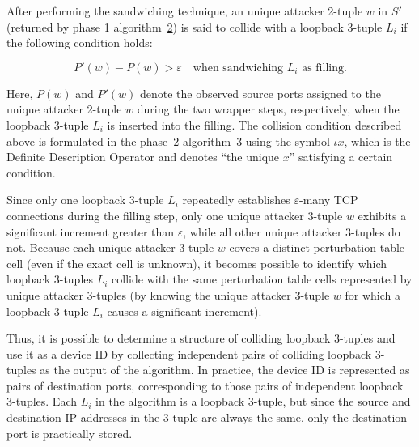 \documentclass[twocolumn]{report}
\begin{document}
After performing the sandwiching technique, an \alert{unique attacker 2-tuple \(w\)} in $S'$ (returned by phase 1 algorithm~\hyperref[alg:phase1]{2}) is said to collide with a \alert{loopback 3-tuple \(L_i\)} if the following \alert{condition} holds:

\begin{minipage}{\columnwidth}
	\begin{equation*}
		P'(w) - P(w) > \varepsilon
		\quad \text{when sandwiching } L_i \text{ as filling.}
	\end{equation*}
\end{minipage}

Here, \(P(w)\) and \(P'(w)\) denote the observed \alert{source ports assigned to} the \alert{unique attacker 2-tuple \(w\)} during the two wrapper steps, respectively, when the loopback 3-tuple \(L_i\) is inserted into the filling. The collision condition described above is formulated in the phase~2 algorithm~\hyperref[alg:phase2]{3} using the symbol \(\iota x\), which is the \alert{Definite Description Operator} and denotes \enquote{the unique \(x\)} satisfying a certain condition.

Since \alert{only one} loopback 3-tuple \(L_i\) repeatedly establishes \(\varepsilon\)-many TCP connections during the filling step, only one unique attacker 3-tuple \(w\) exhibits a \alert{significant increment} greater than \(\varepsilon\), while all other unique attacker 3-tuples do not. Because each unique attacker 3-tuple \(w\) covers a distinct perturbation table cell (even if the exact cell is unknown), it becomes possible to identify which loopback 3-tuples \(L_i\) collide with the same perturbation table cells represented by unique attacker 3-tuples (by knowing the unique attacker 3-tuple \(w\) for which a loopback 3-tuple \(L_i\) causes a significant increment).

Thus, it is possible to determine a structure of colliding loopback 3-tuples and use it as a device ID by collecting independent pairs of colliding loopback 3-tuples as the \alert{output} of the algorithm. In practice, the device ID is represented as \alert{pairs of destination ports}, corresponding to those pairs of independent loopback 3-tuples. Each $L_i$ in the algorithm is a loopback 3-tuple, but since the source and destination IP addresses in the 3-tuple are always the same, only the destination port is practically stored.
\end{document}
